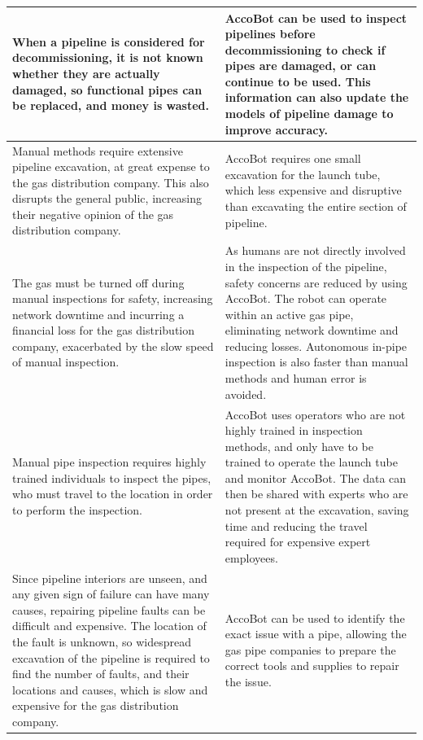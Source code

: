 \documentclass[11pt]{article}		%
\begin{document}
{\begin{longtable}[c]{| m{} | m{} |}
			\hline
			\rowcolor{rowGrey}
			When a pipeline is considered for decommissioning, it is not known whether they are actually damaged, so functional pipes can be replaced, and money is wasted. 
			& 
			AccoBot can be used to inspect pipelines before decommissioning to check if pipes are damaged, or can continue to be used. 
			This information can also update the models of pipeline damage to improve accuracy.
			\\
			\hline
			\rowcolor{rowGrey}
			Manual methods require extensive pipeline excavation, at great expense to the gas distribution company.
			This also disrupts the general public, increasing their negative opinion of the gas distribution company.
			& 
			AccoBot requires one small excavation for the launch tube, which less expensive and disruptive than excavating the entire section of pipeline.
			\\
			\hline
			\rowcolor{rowGrey}
			The gas must be turned off during manual inspections for safety, increasing network downtime and incurring a financial loss for the gas distribution company, exacerbated by the slow speed of manual inspection.
			&
			As humans are not directly involved in the inspection of the pipeline, safety concerns are reduced by using AccoBot.
			The robot can operate within an active gas pipe, eliminating network downtime and reducing losses.
			Autonomous in-pipe inspection is also faster than manual methods and human error is avoided.
			\\
			\hline
			\rowcolor{rowGrey}
			Manual pipe inspection requires highly trained individuals to inspect the pipes, who must travel to the location in order to perform the inspection.
			& 
			AccoBot uses operators who are not highly trained in inspection methods, and only have to be trained to operate the launch tube and monitor AccoBot.
			The data can then be shared with experts who are not present at the excavation, saving time and reducing the travel required for expensive expert employees.
			\\
			\hline
			\rowcolor{rowGrey}
			Since pipeline interiors are unseen, and any given sign of failure can have many causes, repairing pipeline faults can be difficult and expensive.
			The location of the fault is unknown, so widespread excavation of the pipeline is required to find the number of faults, and their locations and causes, which is slow and expensive for the gas distribution company.
			& 
			AccoBot can be used to identify the exact issue with a pipe, allowing the gas pipe companies to prepare the correct tools and supplies to repair the issue.

\end{longtable}}
\end{document}

